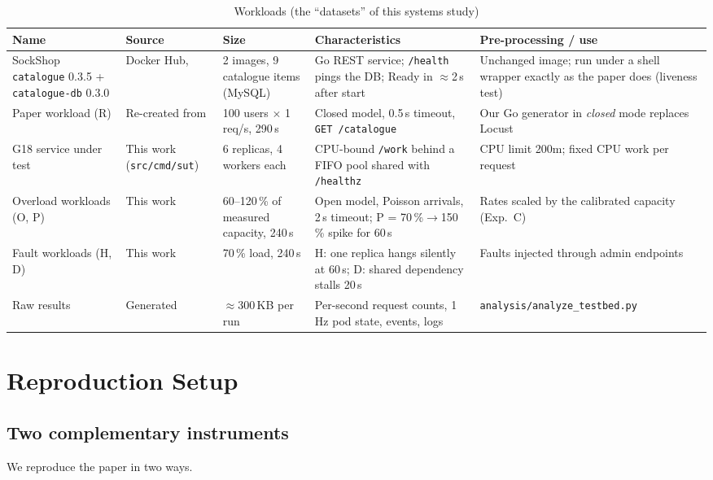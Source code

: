 \documentclass[conference]{IEEEtran}
\begin{document}
\begin{table}[t]
\centering
\caption{Workloads (the ``datasets'' of this systems study)}
\label{tab:data}
\footnotesize
\begin{tabular}{@{}p{2.9cm}p{2.1cm}p{2.6cm}p{4.6cm}p{4.6cm}@{}}
\toprule
Name & Source & Size & Characteristics & Pre-processing / use \\
\midrule
SockShop \texttt{catalogue} 0.3.5 + \texttt{catalogue-db} 0.3.0 &
Docker Hub, \cite{sockshop} & 2 images, 9 catalogue items (MySQL) &
Go REST service; \texttt{/health} pings the DB; Ready in $\approx$2\,s after start &
Unchanged image; run under a shell wrapper exactly as the paper does (liveness test) \\
Paper workload (R) & Re-created from \cite{roberts2025} & 100 users $\times$ 1 req/s, 290\,s & Closed model, 0.5\,s timeout, \texttt{GET /catalogue} & Our Go generator in \emph{closed} mode replaces Locust \\
G18 service under test & This work (\texttt{src/cmd/sut}) & 6 replicas, 4 workers each & CPU-bound \texttt{/work} behind a FIFO pool shared with \texttt{/healthz} & CPU limit 200m; fixed CPU work per request \\
Overload workloads (O, P) & This work & 60--120\,\% of measured capacity, 240\,s & Open model, Poisson arrivals, 2\,s timeout; P = 70\,\%$\rightarrow$150\,\% spike for 60\,s & Rates scaled by the calibrated capacity (Exp.~C) \\
Fault workloads (H, D) & This work & 70\,\% load, 240\,s & H: one replica hangs silently at 60\,s; D: shared dependency stalls 20\,s & Faults injected through admin endpoints \\
Raw results & Generated & $\approx$300\,KB per run & Per-second request counts, 1\,Hz pod state, events, logs & \texttt{analysis/analyze\_testbed.py} \\
\bottomrule
\end{tabular}
\end{table}

\section{Reproduction Setup}
\label{sec:repro}
\subsection{Two complementary instruments}
We reproduce the paper in two ways.
\end{document}
